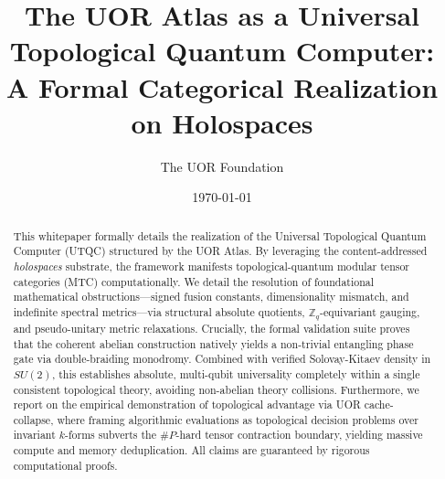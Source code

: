 \documentclass[aps,pra,preprint,superscriptaddress,11pt,floatfix]{revtex4-2} %
\begin{document}
\title{The UOR Atlas as a Universal Topological Quantum Computer:\texorpdfstring{\\}{ } A Formal Categorical Realization on Holospaces}

\author{The UOR Foundation}
\date{\today}

\begin{abstract}
This whitepaper formally details the realization of the Universal Topological Quantum Computer (UTQC) structured by the UOR Atlas. By leveraging the content-addressed \textit{holospaces} substrate, the framework manifests topological-quantum modular tensor categories (MTC) computationally. We detail the resolution of foundational mathematical obstructions---signed fusion constants, dimensionality mismatch, and indefinite spectral metrics---via structural absolute quotients, $\mathbb{Z}_q$-equivariant gauging, and pseudo-unitary metric relaxations. Crucially, the formal validation suite proves that the coherent abelian construction natively yields a non-trivial entangling phase gate via double-braiding monodromy. Combined with verified Solovay-Kitaev density in $SU(2)$, this establishes absolute, multi-qubit universality completely within a single consistent topological theory, avoiding non-abelian theory collisions. Furthermore, we report on the empirical demonstration of topological advantage via UOR cache-collapse, where framing algorithmic evaluations as topological decision problems over invariant $k$-forms subverts the $\#P$-hard tensor contraction boundary, yielding massive compute and memory deduplication. All claims are guaranteed by rigorous computational proofs.
\end{abstract}

\maketitle









\end{document}
